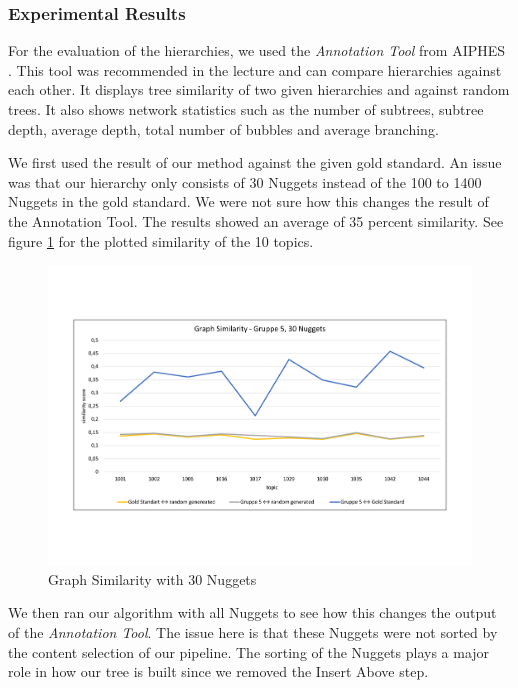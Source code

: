 \subsubsection{Experimental Results}

For the evaluation of the hierarchies, we used the \textit{Annotation Tool} from AIPHES \cite{Tauchmann.et.al.2018.LREC}. This tool was recommended in the lecture and can compare hierarchies against each other. It displays tree similarity of two given hierarchies and against random trees. It also shows network statistics such as the number of subtrees, subtree depth, average depth, total number of bubbles and average branching.

We first used the result of our method against the given gold standard. An issue was that our hierarchy only consists of 30 Nuggets instead of the 100 to 1400 Nuggets in the gold standard. We were not sure how this changes the result of the Annotation Tool. The results showed an average of 35 percent similarity. See figure \ref{fig:graph30} for the plotted similarity of the 10 topics.

\begin{figure}[H]
	\centering
	\includegraphics[trim= 0 130 0 130,width=\textwidth]{img/sim_v1.pdf}
	\caption{Graph Similarity with 30 Nuggets}
	\label{fig:graph30}
\end{figure}

We then ran our algorithm with all Nuggets to see how this changes the output of the \textit{Annotation Tool}. The issue here is that these Nuggets were not sorted by the content selection of our pipeline. The sorting of the Nuggets plays a major role in how our tree is built since we removed the Insert Above step.

